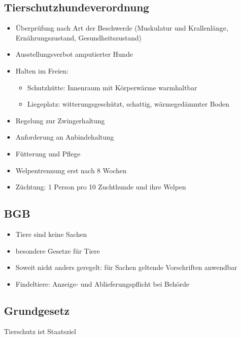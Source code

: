     \subsection{Tierschutzhundeverordnung}
        \begin{itemize}
            \item Überprüfung nach Art der Beschwerde (Muskulatur und Krallenlänge, Ernährungszustand, Gesundheitszustand)
            \item Ausstellungsverbot amputierter Hunde
            \item Halten im Freien:
            \begin{itemize}
                \item Schutzhütte: Innenraum mit Körperwärme warmhaltbar
                \item Liegeplatz: witterungsgeschützt, schattig, wärmegedämmter Boden
            \end{itemize}
            \item Regelung zur Zwingerhaltung
            \item Anforderung an Anbindehaltung
            \item Fütterung und Pflege
            \item Welpentrennung erst nach 8 Wochen
            \item Züchtung: 1 Person pro 10 Zuchthunde und ihre Welpen
        \end{itemize}

    \subsection{BGB}
        \begin{itemize}
            \item Tiere sind keine Sachen
            \item besondere Gesetze für Tiere
            \item Soweit nicht anders geregelt: für Sachen geltende Vorschriften anwendbar
            \item Findeltiere: Anzeige- und Ablieferungspflicht bei Behörde
        \end{itemize}

    \subsection{Grundgesetz}

        Tierschutz ist Staatsziel
